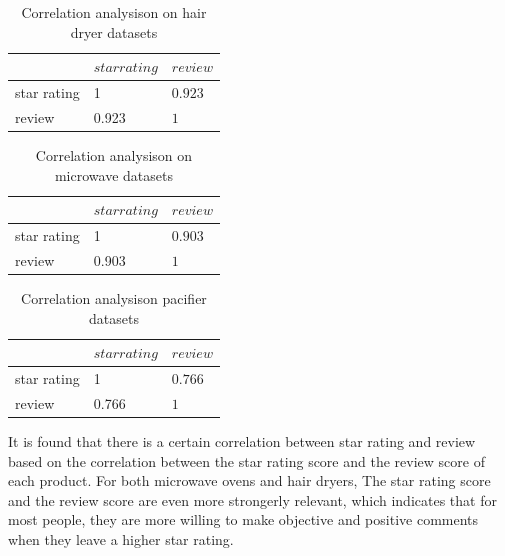 \documentclass[13pt]{ctexart}
\begin{document}
\begin{table}[htbp] %
\caption{Correlation analysison on hair dryer datasets}  
	\centering
	\begin{tabular}{p{3.5cm}<{\centering}p{3.5cm}<{\centering} p{3.5cm}<{\centering}} 
		\toprule[1.5pt]
	      &$ star rating$ & $review $\\ 
		\midrule 
	star rating &1	& $0.923$  \\
	review	&0.923	&  $1 $  \\
	
		\bottomrule[1.5pt] 
	\end{tabular} 
\end{table}


\begin{table}[htbp] %
\caption{Correlation analysison on microwave datasets}  
	\centering
	\begin{tabular}{p{3.5cm}<{\centering}p{3.5cm}<{\centering} p{3.5cm}<{\centering}} 
		\toprule[1.5pt]
	      &$ star rating$ & $review $\\ 
		\midrule 
	star rating &1	& $0.903$  \\
	review	&0.903	&  $1 $  \\
	
		\bottomrule[1.5pt] 
	\end{tabular} 
\end{table}

\begin{table}[htbp] %
\caption{Correlation analysison pacifier datasets}  
	\centering
	\begin{tabular}{p{3.5cm}<{\centering}p{3.5cm}<{\centering} p{3.5cm}<{\centering}} 
		\toprule[1.5pt]
	      &$ star rating$ & $review $\\ 
		\midrule 
	star rating &1	& $0.766$  \\
	review	&0.766	&  $1 $  \\
	
		\bottomrule[1.5pt] 
	\end{tabular} 
\end{table}

It is found that there is a certain correlation between star rating and review based on the correlation between the star rating score and the review score of each product. For both microwave ovens and hair dryers,
The star rating score and the review score are even more strongerly relevant, which indicates that for most people, they are more willing to make objective and positive comments when they leave a higher star rating.
\end{document}
